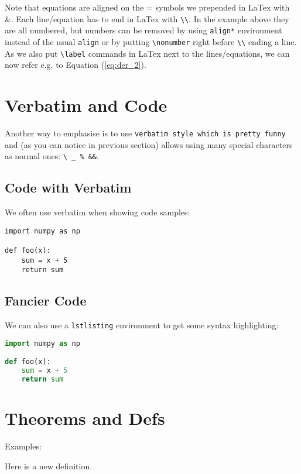 Note that equations are aligned on the = symbols we prepended in LaTex with \&. Each line/equation has to end in LaTex with \verb|\\|. In the example above they are all numbered, but numbers can be removed by using \verb|align*| environment instead of the usual \verb|align| or by putting \verb|\nonumber| right before \verb|\\| ending a line. As we also put \verb|\label| commands in LaTex next to the lines/equations, we can now refer e.g. to Equation (\ref{eq:der_2}).

\section{Verbatim and Code}

Another way to emphasise is to use \verb|verbatim style which is pretty funny| and (as you can notice in previous section) allows using many special characters as normal ones: \verb|\ _ % &&|.

\subsection{Code with Verbatim}

We often use verbatim when showing code samples:

\begin{verbatim}
import numpy as np

def foo(x):
	sum = x + 5
	return sum
\end{verbatim}

\subsection{Fancier Code}

We can also use a \verb|lstlisting| environment to get some syntax highlighting:

\begin{lstlisting}[language=Python]
import numpy as np

def foo(x):
	sum = x + 5
	return sum
\end{lstlisting}

\section{Theorems and Defs} \label{sec:theorems}

Examples:

\begin{defn} Here is a new definition.\end{defn}

